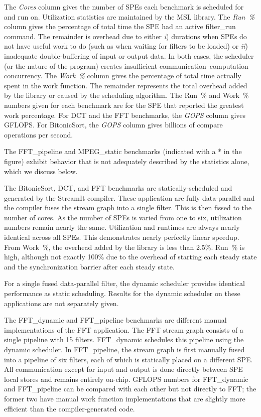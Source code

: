 The \emph{Cores} column gives the number of SPEs each benchmark is
scheduled for and run on. Utilization statistics are maintained by the
MSL library. The \emph{Run~\%} column gives the percentage of total time the SPE had an active \textsf{filter\_run} command. The remainder is overhead due to either \emph{i}) durations when SPEs do not have useful work to do (such as when waiting for filters to be loaded) or \emph{ii}) inadequate double-buffering of input or output data. In both cases, the scheduler (or the nature of the program) creates insufficient communication--computation concurrency. The \emph{Work~\%} column gives the percentage of total time actually spent in the work function. The remainder represents the total overhead added by the library or caused by the scheduling algorithm.
The Run~\% and Work~\% numbers given for each benchmark are for the SPE
that reported the greatest work percentage.
For \textsf{DCT} and the FFT benchmarks, the \emph{GOPS} column gives GFLOPS.
For \textsf{BitonicSort}, the \emph{GOPS} column gives billions of
compare operations per second.

The \textsf{FFT\_pipeline} and \textsf{MPEG\_static} benchmarks (indicated
with a \textsf{*} in the figure) exhibit behavior that is not adequately
described by the statistics alone, which we discuss below.

The \textsf{BitonicSort}, \textsf{DCT}, and \textsf{FFT} benchmarks are statically-scheduled and generated by the StreamIt compiler. These application are fully data-parallel and the compiler fuses the stream graph into a single filter. This is then fissed to the number of cores. 
As the number of SPEs is varied from one to six, utilization numbers remain nearly the same. Utilization and runtimes are always nearly identical across all SPEs. This demonstrates nearly perfectly linear speedup.
From Work~\%, the overhead added by the library is less than 2.5\%. Run~\% is high, although not exactly 100\% due to the overhead of starting each steady state and the synchronization barrier after each steady state.

For a single fused data-parallel filter, the dynamic scheduler provides identical performance as static scheduling. Results for the dynamic scheduler on these applications are not separately given.

The \textsf{FFT\_dynamic} and \textsf{FFT\_pipeline} benchmarks are different manual implementations of the FFT application. The FFT stream graph consists of a single pipeline with 15 filters. \textsf{FFT\_dynamic} schedules this pipeline using the dynamic scheduler. In \textsf{FFT\_pipeline}, the stream graph is first manually fused into a pipeline of six filters, each of which is statically placed on a different SPE. All communication except for input and output is done directly between SPE local stores and remains entirely on-chip. GFLOPS numbers for \textsf{FFT\_dynamic} and \textsf{FFT\_pipeline} can be compared with each other but not directly to \textsf{FFT}; the former two have manual work function implementations that are slightly more efficient than the compiler-generated code.

